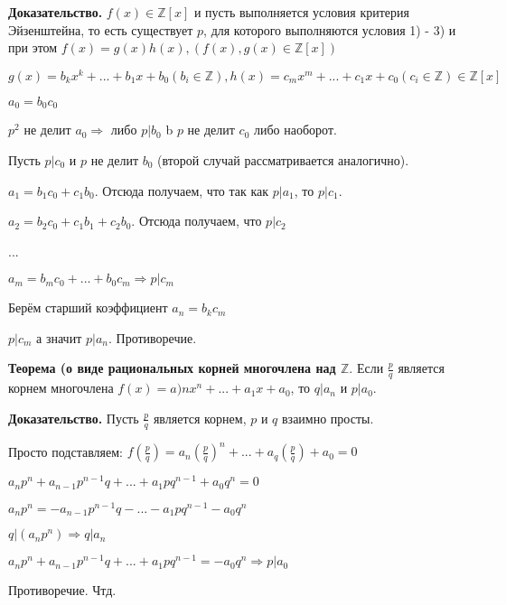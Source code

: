 \documentclass[a4paper]{article}
\begin{document}
\begin{hproof}\textbf{Доказательство.}
$f(x) \in \mathbb{Z}[x]$ и пусть выполняется условия критерия Эйзенштейна, то есть существует $p$, для которого выполняются условия 1) - 3) и при этом $f(x) = g(x)h(x), (f(x), g(x) \in \mathbb{Z}[x])$

$g(x) = b_kx^k + ... + b_1x+b_0 (b_i \in \mathbb{Z}), h(x) = c_mx^m + ... + c_1x + c_0 (c_i \in \mathbb{Z}) \in \mathbb{Z}[x]$

$a_0 = b_0c_0$

$p^2$ не делит $a_0 \Rightarrow$ либо $p|b_0$ b $p$ не делит $c_0$ либо наоборот.

Пусть $p|c_0$ и $p$ не делит $b_0$ (второй случай рассматривается аналогично).

$a_1 = b_1c_0 + c_1b_0$. Отсюда получаем, что так как $p|a_1$, то $p|c_1$.

$a_2 = b_2c_0 + c_1b_1 + c_2b_0$. Отсюда получаем, что $p|c_2$

...

$a_m = b_mc_0 + ... + b_0c_m \Rightarrow p|c_m$

Берём старший коэффициент
$a_n = b_kc_m$

$p|c_m$ а значит $p|a_n$. Противоречие.
\end{hproof}

\begin{htheorem}\textbf{Теорема (о виде рациональных корней многочлена над $\mathbb{Z}$}.
Если $\frac{p}{q}$ является корнем многочлена $f(x) = a)nx^n + ... + a_1x + a_0$, то $q|a_n$ и $p|a_0$.
\end{htheorem}

\begin{hproof}\textbf{Доказательство.}
Пусть $\frac{p}{q}$ является корнем, $p$ и $q$ взаимно просты.

Просто подставляем: $f(\frac{p}{q}) = a_n(\frac{p}{q})^n + ... + a_q(\frac{p}{q}) + a_0 = 0$

$a_np^n + a_{n-1}p^{n-1}q + ... + a_1pq^{n-1} + a_0q^n = 0$

$a_np^n = - a_{n-1}p^{n-1}q - ... - a_1pq^{n-1} - a_0q^n$

$q|(a_np^n) \Rightarrow q|a_n$

$a_np^n + a_{n-1}p^{n-1}q + ... + a_1pq^{n-1} = -a_0q^n \Rightarrow p|a_0$

Противоречие. Чтд.

\end{hproof}
\end{document}
